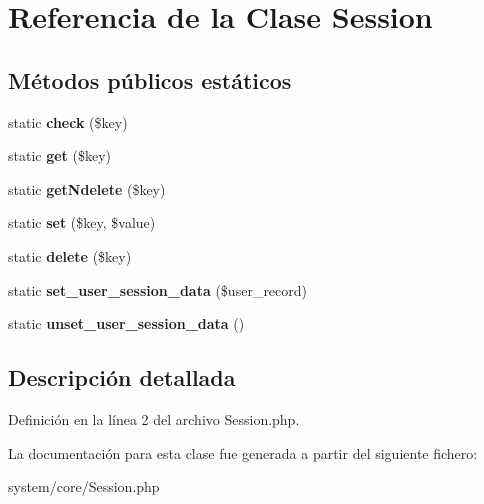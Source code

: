 \hypertarget{class_session}{}\section{Referencia de la Clase Session}
\label{class_session}
\subsection*{Métodos públicos estáticos}
\begin{DoxyCompactItemize}
\item 
\mbox{\label{class_session_abbc453dff32fed9748e3873ab9093050}} 
static {\bfseries check} (\$key)
\item 
\mbox{\label{class_session_a555ab9c7731c0103b16baf165e34efe8}} 
static {\bfseries get} (\$key)
\item 
\mbox{\label{class_session_a894fdbe24e887cc604178f0234355440}} 
static {\bfseries get\+Ndelete} (\$key)
\item 
\mbox{\label{class_session_a5c3bf67e192c10d185e759567df6782a}} 
static {\bfseries set} (\$key, \$value)
\item 
\mbox{\label{class_session_a1661dab5f97e1fb80ba16a1098a73649}} 
static {\bfseries delete} (\$key)
\item 
\mbox{\label{class_session_a1e8f0c2d0f7080ea93b738dba952c52f}} 
static {\bfseries set\+\_\+user\+\_\+session\+\_\+data} (\$user\+\_\+record)
\item 
\mbox{\label{class_session_a9dac1e34e7d797173f4a977a83fb9dae}} 
static {\bfseries unset\+\_\+user\+\_\+session\+\_\+data} ()
\end{DoxyCompactItemize}


\subsection{Descripción detallada}


Definición en la línea 2 del archivo Session.\+php.



La documentación para esta clase fue generada a partir del siguiente fichero\+:\begin{DoxyCompactItemize}
\item 
system/core/Session.\+php\end{DoxyCompactItemize}
